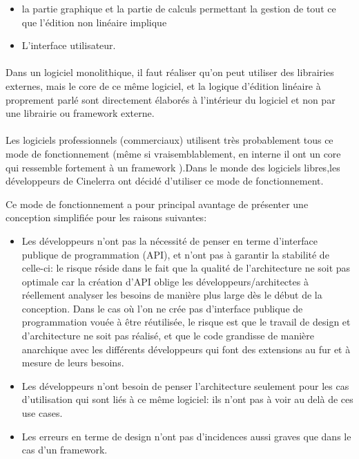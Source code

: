 \begin{itemize} \setlength{\itemsep}{2mm}

  \item {la partie graphique et la partie de calculs
    permettant la gestion de tout ce que l'édition non linéaire
    implique}

  \item {L'interface utilisateur.}

\end {itemize}

\paragraph{}

Dans un logiciel monolithique, il faut réaliser qu'on
peut utiliser des librairies externes, mais le core de ce même logiciel,
et la logique d'édition linéaire à proprement parlé sont directement
élaborés à l'intérieur du logiciel et non par une librairie ou
framework  externe.

\paragraph{}

Les logiciels professionnels (commerciaux) utilisent très probablement
tous ce mode de fonctionnement (même si vraisemblablement,
en interne il ont un core qui ressemble fortement à un framework
).Dans le monde des logiciels libres,les développeurs
de Cinelerra ont décidé d'utiliser ce mode de fonctionnement.

Ce mode de fonctionnement a pour principal avantage de présenter une
conception simplifiée pour les raisons suivantes:


\begin{itemize} \setlength{\itemsep}{2mm}

  \item {Les développeurs n'ont pas la nécessité de penser
    en terme d'interface publique de programmation (API), et
    n'ont pas à garantir la stabilité de celle-ci: le risque réside
    dans le fait que la qualité de l'architecture ne soit pas optimale
    car la création d'API oblige les développeurs/architectes
    à réellement analyser les besoins de manière plus large dès
    le début de la conception. Dans le cas où l'on ne crée pas
    d'interface publique de programmation vouée à être réutilisée,
    le risque est que le travail de design et d'architecture ne soit
    pas réalisé, et que le code grandisse de manière anarchique avec
    les différents développeurs qui font des extensions au fur et à
    mesure de leurs besoins.}

  \item {Les développeurs n'ont besoin de penser l'architecture seulement
  pour les cas d'utilisation qui sont liés à ce même logiciel:
    ils n'ont pas à voir au delà de ces use cases.}

  \item {Les erreurs en terme de design n'ont pas d'incidences aussi
    graves que dans le cas d'un framework.}
\end {itemize}

